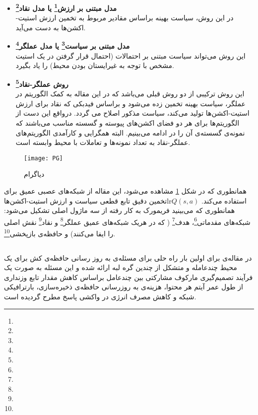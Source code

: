 \begin{itemize}
	\item \textbf{مدل مبتنی بر ارزش\footnote{} یا مدل نقاد\footnote{}}\\
	در این روش، سیاست بهینه براساس مقادیر مربوط به تخمین ارزش استیت-اکشن‌ها  به دست می‌آید. 
	\item \textbf{مدل مبتنی بر سیاست\footnote{} یا مدل عملگر\footnote{}}\\
	این روش می‌تواند سیاست مبتنی بر احتمالات (احتمال قرار گرفتن در یک استیت مشخص با توجه به غیرایستان بودن محیط)  را یاد بگیرد.
	
	\item \textbf{روش عملگر-نقاد\footnote{}}\\
	این روش ترکیبی از دو روش قبلی می‌باشد که در این مقاله به کمک الگوریتم  در عملگر، سیاست بهینه تخمین زده می‌شود و براساس فیدبکی که نقاد برای ارزش استیت-اکشن‌ها تولید می‌کند، سیاست مذکور اصلاح می گردد. درواقع این دست از الگوریتم‌ها برای هر دو فضای اکشن‌های پیوسته و گسسته مناسب می‌باشند که نمونه‌ی گسسته‌ی آن را در ادامه می‌بینیم. البته همگرایی و کارآمدی الگوریتم‌های عملگر-نقاد به تعداد نمونه‌ها و تعاملات با محیط وابسته است.
	
\end{itemize}

\begin{figure}[ht]
	\centerline{\texttt{[image: PG]}}
	\caption{دیاگرام }
	\label{fig:PG}
\end{figure}

 همانطوری که در شکل \ref{fig:PG} مشاهده می‌شود، این مقاله از شبکه‌های عصبی عمیق برای تخمین دقیق تابع قطعی سیاست و ارزش استیت-اکشن‌هاlr{$Q(s, a)$} استفاده می‌کند. همانطوری که می‌بینید فریمورک به کار رفته از سه ماژول اصلی تشکیل می‌شود: شبکه‌های مقدماتی\footnote{}، هدف\footnote{} ( که در هریک شبکه‌های عمیق عملگر\footnote{} و نقاد\footnote{} نقش اصلی را ایفا می‌کنند) و حافظه‌ی بازپخشی\footnote{}.

\subsection{}
در مقاله‌ی \cite{wu2021caching} برای اولین بار راه حلی برای مسئله‌ی به روز رسانی حافظه‌ی کش برای یک محیط چندعامله و متشکل از چندین گره لبه ارائه شده و این مسئله به صورت یک فرآیند تصمیم‌گیری مارکوف مشارکتی بین چندعامل براساس کاهش مقدار تابع وزنداری از طول عمر آیتم هر محتوا، هزینه‌ی به روزرسانی حافظه‌ی ذخیره‌سازی، بارترافیکی شبکه و کاهش مصرف انرژی در واکشی پاسخ مطرح گردیده است. 


